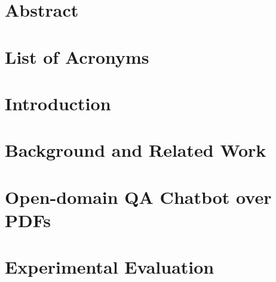 \documentclass[
     12pt,         %
     a4paper,      %
     BCOR10mm,     %
     DIV14,        %
     ]{scrreprt}
\begin{document}
\chapter*{Abstract}

\newpage

\tableofcontents
\cleardoublepage
{} 

\chapter*{List of Acronyms}
\printglossary[type=\acronymtype]

\listoffigures
\listoftables



\chapter{Introduction}
\label{chap:intro}


\newpage

\chapter{Background and Related Work}
\label{chap:grundlagen}



\newpage

\chapter{Open-domain QA Chatbot over PDFs}
\label{chap:main}



\newpage

\chapter{Experimental Evaluation}
\label{chap:eval}
\end{document}
